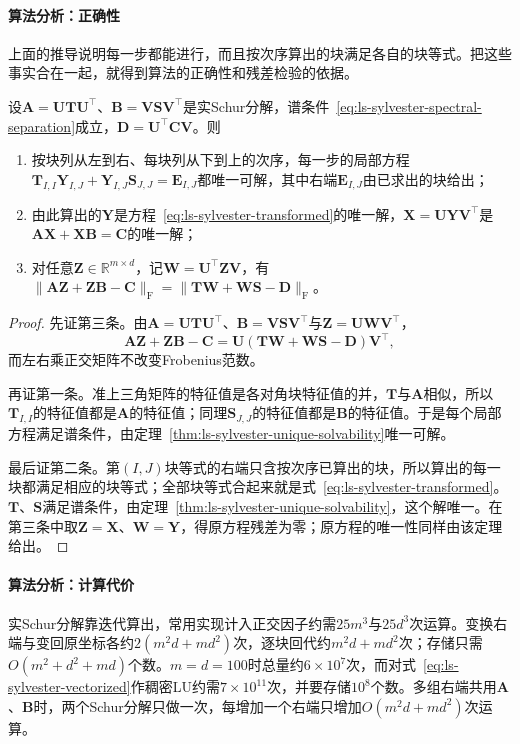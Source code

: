 \paragraph{算法分析：正确性}
上面的推导说明每一步都能进行，而且按次序算出的块满足各自的块等式。把这些事实合在一起，就得到算法的正确性和残差检验的依据。

\begin{theorem}
\label{thm:ls-bartels-stewart}
设$\bm A=\bm U\bm T\bm U^\top$、$\bm B=\bm V\bm S\bm V^\top$是实Schur分解，谱条件~\eqref{eq:ls-sylvester-spectral-separation}成立，$\bm D=\bm U^\top\bm C\bm V$。则
\begin{enumerate}
 \item 按块列从左到右、每块列从下到上的次序，每一步的局部方程$\bm T_{I,I}\bm Y_{I,J}+\bm Y_{I,J}\bm S_{J,J}=\bm E_{I,J}$都唯一可解，其中右端$\bm E_{I,J}$由已求出的块给出；
 \item 由此算出的$\bm Y$是方程~\eqref{eq:ls-sylvester-transformed}的唯一解，$\bm X=\bm U\bm Y\bm V^\top$是$\bm A\bm X+\bm X\bm B=\bm C$的唯一解；
 \item 对任意$\bm Z\in\mathbb R^{m\times d}$，记$\bm W=\bm U^\top\bm Z\bm V$，有$\lVert\bm A\bm Z+\bm Z\bm B-\bm C\rVert_{\mathrm F}=\lVert\bm T\bm W+\bm W\bm S-\bm D\rVert_{\mathrm F}$。
\end{enumerate}
\end{theorem}

\begin{proof}
先证第三条。由$\bm A=\bm U\bm T\bm U^\top$、$\bm B=\bm V\bm S\bm V^\top$与$\bm Z=\bm U\bm W\bm V^\top$，
\[
 \bm A\bm Z+\bm Z\bm B-\bm C=\bm U(\bm T\bm W+\bm W\bm S-\bm D)\bm V^\top,
\]
而左右乘正交矩阵不改变Frobenius范数。

再证第一条。准上三角矩阵的特征值是各对角块特征值的并，$\bm T$与$\bm A$相似，所以$\bm T_{I,I}$的特征值都是$\bm A$的特征值；同理$\bm S_{J,J}$的特征值都是$\bm B$的特征值。于是每个局部方程满足谱条件，由定理~\ref{thm:ls-sylvester-unique-solvability}唯一可解。

最后证第二条。第$(I,J)$块等式的右端只含按次序已算出的块，所以算出的每一块都满足相应的块等式；全部块等式合起来就是式~\eqref{eq:ls-sylvester-transformed}。$\bm T$、$\bm S$满足谱条件，由定理~\ref{thm:ls-sylvester-unique-solvability}，这个解唯一。在第三条中取$\bm Z=\bm X$、$\bm W=\bm Y$，得原方程残差为零；原方程的唯一性同样由该定理给出。
\end{proof}

\paragraph{算法分析：计算代价}
实Schur分解靠迭代算出，常用实现计入正交因子约需$25m^3$与$25d^3$次运算。变换右端与变回原坐标各约$2(m^2d+md^2)$次，逐块回代约$m^2d+md^2$次；存储只需$O(m^2+d^2+md)$个数。$m=d=100$时总量约$6\times10^7$次，而对式~\eqref{eq:ls-sylvester-vectorized}作稠密LU约需$7\times10^{11}$次，并要存储$10^8$个数。多组右端共用$\bm A$、$\bm B$时，两个Schur分解只做一次，每增加一个右端只增加$O(m^2d+md^2)$次运算。

